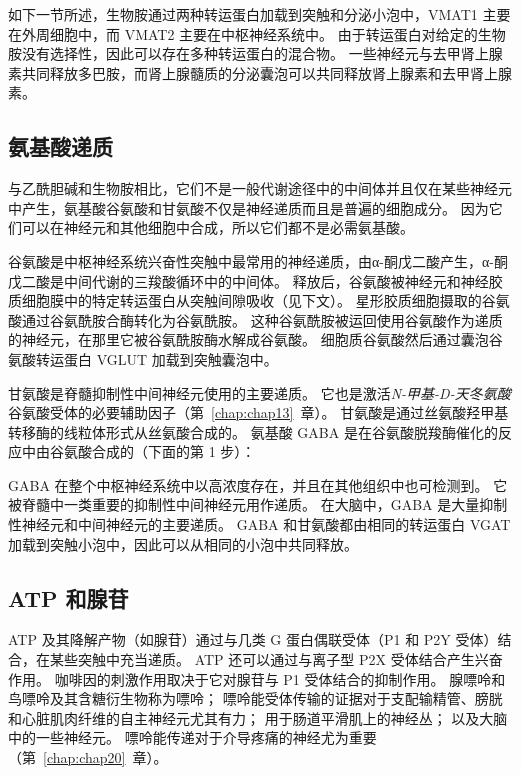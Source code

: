 如下一节所述，生物胺通过两种转运蛋白加载到突触和分泌小泡中，VMAT1 主要在外周细胞中，而 VMAT2 主要在中枢神经系统中。
由于转运蛋白对给定的生物胺没有选择性，因此可以存在多种转运蛋白的混合物。
一些神经元与去甲肾上腺素共同释放多巴胺，而肾上腺髓质的分泌囊泡可以共同释放肾上腺素和去甲肾上腺素。



\subsection{氨基酸递质}

与乙酰胆碱和生物胺相比，它们不是一般代谢途径中的中间体并且仅在某些神经元中产生，氨基酸谷氨酸和甘氨酸不仅是神经递质而且是普遍的细胞成分。
因为它们可以在神经元和其他细胞中合成，所以它们都不是必需氨基酸。


谷氨酸是中枢神经系统兴奋性突触中最常用的神经递质，由α-酮戊二酸产生，α-酮戊二酸是中间代谢的三羧酸循环中的中间体。
释放后，谷氨酸被神经元和神经胶质细胞膜中的特定转运蛋白从突触间隙吸收（见下文）。
星形胶质细胞摄取的谷氨酸通过谷氨酰胺合酶转化为谷氨酰胺。
这种谷氨酰胺被运回使用谷氨酸作为递质的神经元，在那里它被谷氨酰胺酶水解成谷氨酸。
细胞质谷氨酸然后通过囊泡谷氨酸转运蛋白 VGLUT 加载到突触囊泡中。


甘氨酸是脊髓抑制性中间神经元使用的主要递质。
它也是激活\textit{N-甲基-D-天冬氨酸}谷氨酸受体的必要辅助因子（第~\ref{chap:chap13}~章）。
甘氨酸是通过丝氨酸羟甲基转移酶的线粒体形式从丝氨酸合成的。
氨基酸 GABA 是在谷氨酸脱羧酶催化的反应中由谷氨酸合成的（下面的第 1 步）：


GABA 在整个中枢神经系统中以高浓度存在，并且在其他组织中也可检测到。
它被脊髓中一类重要的抑制性中间神经元用作递质。
在大脑中，GABA 是大量抑制性神经元和中间神经元的主要递质。
GABA 和甘氨酸都由相同的转运蛋白 VGAT 加载到突触小泡中，因此可以从相同的小泡中共同释放。



\subsection{ATP 和腺苷}

ATP 及其降解产物（如腺苷）通过与几类 G 蛋白偶联受体（P1 和 P2Y 受体）结合，在某些突触中充当递质。
ATP 还可以通过与离子型 P2X 受体结合产生兴奋作用。
咖啡因的刺激作用取决于它对腺苷与 P1 受体结合的抑制作用。
腺嘌呤和鸟嘌呤及其含糖衍生物称为嘌呤；
嘌呤能受体传输的证据对于支配输精管、膀胱和心脏肌肉纤维的自主神经元尤其有力；
用于肠道平滑肌上的神经丛；
以及大脑中的一些神经元。
嘌呤能传递对于介导疼痛的神经尤为重要（第~\ref{chap:chap20}~章）。


